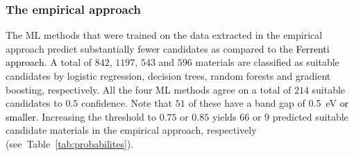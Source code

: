 \documentclass[superscriptaddress,unsortedaddress,
 amsmath,amssymb,
 aps,
]{revtex4-2}
\newcommand{\mrk}[1]{\textcolor{black}{#1}}
\begin{document}
 
\subsubsection*{The empirical approach}
The ML methods that were trained on the data extracted in the empirical approach predict substantially fewer candidates as compared to the \mrk{Ferrenti approach}. 
A total of $842$, $1197$, $543$ and $596$ materials are classified as suitable candidates by logistic regression, decision trees, random forests and gradient boosting, respectively. All the four ML methods agree on a total of $214$ suitable candidates to $0.5$ confidence.   
Note that $51$ of these have a band gap of \SI{0.5}{\electronvolt} \mrk{or smaller}. Increasing the threshold to $0.75$ or $0.85$ yields $66$ or $9$ predicted suitable candidate materials in the empirical approach, respectively (see~Table~\ref{tab:probabilites}). 
\end{document}
